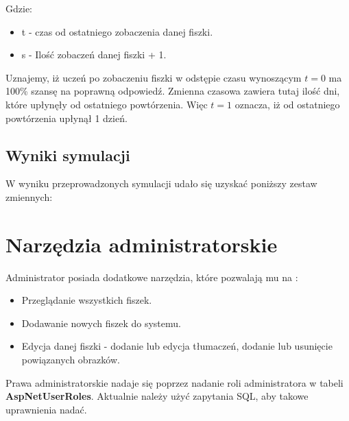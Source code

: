 
Gdzie:
\begin{itemize}
\setlength\itemsep{1mm}
	\item t - czas od ostatniego zobaczenia danej fiszki.
	\item s - Ilość zobaczeń danej fiszki + 1.
\end{itemize}

Uznajemy, iż uczeń po zobaczeniu fiszki w odstępie czasu wynoszącym $t = 0$ ma 100\% szansę na poprawną odpowiedź. 
Zmienna czasowa zawiera tutaj ilość dni, które upłynęły od ostatniego powtórzenia. Więc $t = 1$ oznacza, iż od ostatniego powtórzenia upłynął 1 dzień. 


\subsection{Wyniki symulacji}
W wyniku przeprowadzonych symulacji udało się uzyskać poniższy zestaw zmiennych:



\newpage
\section{Narzędzia administratorskie}

Administrator posiada dodatkowe narzędzia, które pozwalają mu na :
\begin{itemize}
	\item Przeglądanie wszystkich fiszek.
	\item Dodawanie nowych fiszek do systemu.
	\item Edycja danej fiszki - dodanie lub edycja tłumaczeń, dodanie lub usunięcie powiązanych obrazków.
\end{itemize}
Prawa administratorskie nadaje się poprzez nadanie roli administratora w tabeli \textbf{AspNetUserRoles}. Aktualnie należy użyć zapytania SQL, aby takowe uprawnienia nadać. 

